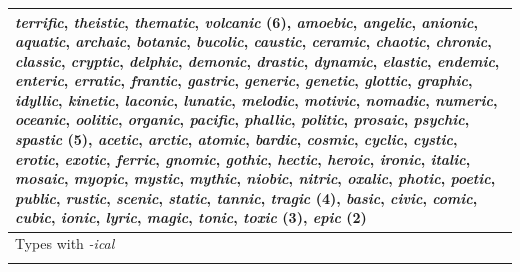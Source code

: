 \begin{table}[!htbp]
{\begin{tabular}[t]{l}
{\begin{minipage}[t]{\textwidth}
\textit{terrific}, \textit{theistic}, \textit{thematic}, \textit{volcanic} (6), \textit{amoebic}, \textit{angelic}, \textit{anionic}, \textit{aquatic}, \textit{archaic}, \textit{botanic}, \textit{bucolic}, \textit{caustic}, \textit{ceramic}, \textit{chaotic}, \textit{chronic}, \textit{classic}, \textit{cryptic}, \textit{delphic}, \textit{demonic}, \textit{drastic}, \textit{dynamic}, \textit{elastic}, \textit{endemic}, \textit{enteric}, \textit{erratic}, \textit{frantic}, \textit{gastric}, \textit{generic}, \textit{genetic}, \textit{glottic}, \textit{graphic}, \textit{idyllic}, \textit{kinetic}, \textit{laconic}, \textit{lunatic}, \textit{melodic}, \textit{motivic}, \textit{nomadic}, \textit{numeric}, \textit{oceanic}, \textit{oolitic}, \textit{organic}, \textit{pacific}, \textit{phallic}, \textit{politic}, \textit{prosaic}, \textit{psychic}, \textit{spastic} (5), \textit{acetic}, \textit{arctic}, \textit{atomic}, \textit{bardic}, \textit{cosmic}, \textit{cyclic}, \textit{cystic}, \textit{erotic}, \textit{exotic}, \textit{ferric}, \textit{gnomic}, \textit{gothic}, \textit{hectic}, \textit{heroic}, \textit{ironic}, \textit{italic}, \textit{mosaic}, \textit{myopic}, \textit{mystic}, \textit{mythic}, \textit{niobic}, \textit{nitric}, \textit{oxalic}, \textit{photic}, \textit{poetic}, \textit{public}, \textit{rustic}, \textit{scenic}, \textit{static}, \textit{tannic}, \textit{tragic} (4), \textit{basic}, \textit{civic}, \textit{comic}, \textit{cubic}, \textit{ionic}, \textit{lyric}, \textit{magic}, \textit{tonic}, \textit{toxic} (3), \textit{epic} (2)
\end{minipage}} \\
\midrule
Types with \textit{-ical} \\
\midrule
\makecell[tl]{
\begin{minipage}[t]{\textwidth} \raggedright

\end{minipage}}
\end{tabular}}
\end{table}
